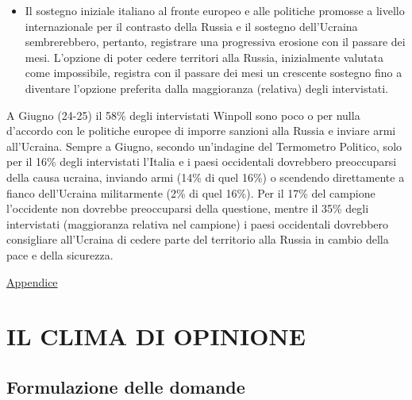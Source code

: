 \documentclass[
]{book}
\providecommand{\tightlist}{%
  \setlength{\itemsep}{0pt}\setlength{\parskip}{0pt}}
\begin{document}
\begin{itemize}
\tightlist
\item
  Il sostegno iniziale italiano al fronte europeo e alle politiche promosse a livello internazionale per il contrasto della Russia e il sostegno dell'Ucraina sembrerebbero, pertanto, registrare una progressiva erosione con il passare dei mesi. L'opzione di poter cedere territori alla Russia, inizialmente valutata come impossibile, registra con il passare dei mesi un crescente sostegno fino a diventare l'opzione preferita dalla maggioranza (relativa) degli intervistati.
\end{itemize}

A Giugno (24-25) il 58\% degli intervistati Winpoll sono poco o per nulla d'accordo con le politiche europee di imporre sanzioni alla Russia e inviare armi all'Ucraina.
Sempre a Giugno, secondo un'indagine del Termometro Politico, solo per il 16\% degli intervistati l'Italia e i paesi occidentali dovrebbero preoccuparsi della causa ucraina, inviando armi (14\% di quel 16\%) o scendendo direttamente a fianco dell'Ucraina militarmente (2\% di quel 16\%). Per il 17\% del campione l'occidente non dovrebbe preoccuparsi della questione, mentre il 35\% degli intervistati (maggioranza relativa nel campione) i paesi occidentali dovrebbero consigliare all'Ucraina di cedere parte del territorio alla Russia in cambio della pace e della sicurezza.

\href{https://github.com/LucianaFazio/Ucrania/blob/main/VI.\%20Gli\%20effetti\%20del\%20conflitto\%20v.3.pdf}{Appendice}

\hypertarget{il-clima-di-opinione}{%
\chapter{IL CLIMA DI OPINIONE}\label{il-clima-di-opinione}}

\hypertarget{formulazione-delle-domande-5}{%
\section{Formulazione delle domande}\label{formulazione-delle-domande-5}}
\end{document}

